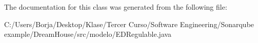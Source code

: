 The documentation for this class was generated from the following file\+:\begin{DoxyCompactItemize}
\item 
C\+:/\+Users/\+Borja/\+Desktop/\+Klase/\+Tercer Curso/\+Software Engineering/\+Sonarqube example/\+Dream\+House/src/modelo/E\+D\+Regulable.\+java\end{DoxyCompactItemize}
